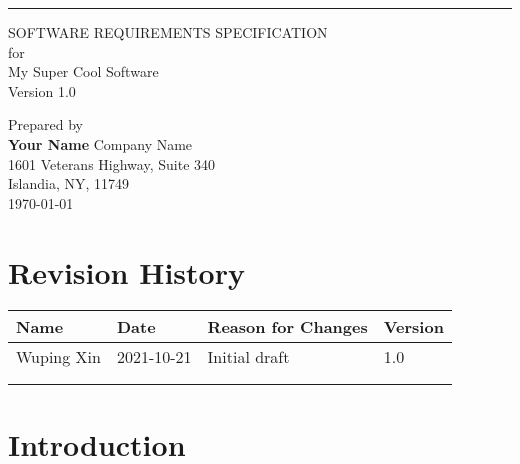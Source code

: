 \documentclass{scrreprt}
\def\myauthorname{Your Name}
\def\myorganization{Company Name\\1601 Veterans Highway, Suite 340 \\ Islandia, NY, 11749}
\def\mysubject{My Super Cool Software}
\def\myversion{1.0}
\begin{document}
\thispagestyle{empty}
 
\begin{flushright}
    \rule{16cm}{5pt}\vskip 0.8cm
    \begin{bfseries}
        \LARGE{SOFTWARE REQUIREMENTS SPECIFICATION}\\
        \vspace{0.8cm}
        for \\
        \vspace{0.8cm}
        \Huge{\mysubject}\\
        \vspace{1.9cm}
        \Large{Version \myversion}\\
    \end{bfseries}        
        \vfill                
        \large 	Prepared by\\
        \vspace{0.25cm}
        \LARGE \textbf{\myauthorname}        
        \vfill        
        \large \myorganization\\        
        \vspace{0.5cm}
	    \today\\
\end{flushright}

\chapter*{Revision History}
\setcounter{page}{1}
\begin{center}
	\begin{tabular}{@{} l l p{6.5cm} l @{}}
		\toprule
		\textbf{Name}    & \textbf{Date}   & \textbf{Reason for Changes} & \textbf{Version} \\ 
		\midrule
		Wuping Xin       & 2021-10-21      & Initial draft               & 1.0              \\
		&                &                 &                                                \\
		&                &                 &                                                \\
		\bottomrule
	\end{tabular}
\end{center}

\tableofcontents

\chapter{Introduction}
\end{document}
